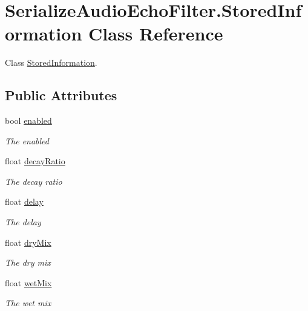 \hypertarget{class_serialize_audio_echo_filter_1_1_stored_information}{}\section{Serialize\+Audio\+Echo\+Filter.\+Stored\+Information Class Reference}
\label{class_serialize_audio_echo_filter_1_1_stored_information}


Class \hyperlink{class_serialize_audio_echo_filter_1_1_stored_information}{Stored\+Information}.  


\subsection*{Public Attributes}
\begin{DoxyCompactItemize}
\item 
bool \hyperlink{class_serialize_audio_echo_filter_1_1_stored_information_a267d7fa82ff1bf5d2bdcd97c2ef16413}{enabled}
\begin{DoxyCompactList}\small\item\em The enabled \end{DoxyCompactList}\item 
float \hyperlink{class_serialize_audio_echo_filter_1_1_stored_information_a5a57a72423fdd52354dbe3b9da178294}{decay\+Ratio}
\begin{DoxyCompactList}\small\item\em The decay ratio \end{DoxyCompactList}\item 
float \hyperlink{class_serialize_audio_echo_filter_1_1_stored_information_a595d86c193276a2a2ea4baa9bfac9151}{delay}
\begin{DoxyCompactList}\small\item\em The delay \end{DoxyCompactList}\item 
float \hyperlink{class_serialize_audio_echo_filter_1_1_stored_information_ac5578bb71e7312675ab9a14941c6726f}{dry\+Mix}
\begin{DoxyCompactList}\small\item\em The dry mix \end{DoxyCompactList}\item 
float \hyperlink{class_serialize_audio_echo_filter_1_1_stored_information_a9cf5cb8c7d3655d3ce2d8351a2646b0d}{wet\+Mix}
\begin{DoxyCompactList}\small\item\em The wet mix \end{DoxyCompactList}\end{DoxyCompactItemize}


